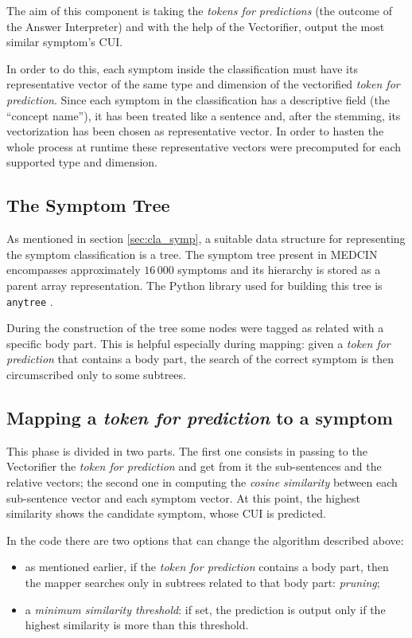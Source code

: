 The aim of this component is taking the \textit{tokens for predictions} (the outcome of the Answer Interpreter) and with the help of the Vectorifier, output the most similar symptom's CUI.

In order to do this, each symptom inside the classification must have its representative vector of the same type and dimension of the vectorified \textit{token for prediction}. Since each symptom in the classification has a descriptive field (the ``concept name''), it has been treated like a sentence and, after the stemming, its vectorization has been chosen as representative vector. In order to hasten the whole process at runtime these representative vectors were precomputed for each supported type and dimension.

\subsection{The Symptom Tree}
As mentioned in section \ref{sec:cla_symp}, a suitable data structure for representing the symptom classification is a tree. The symptom tree present in MEDCIN encompasses approximately $16\,000$ symptoms and its hierarchy is stored as a parent array representation. The Python library used for building this tree is \texttt{anytree} \cite{anytree}.

During the construction of the tree some nodes were tagged as related with a specific body part. This is helpful especially during mapping: given a \textit{token for prediction} that contains a body part, the search of the correct symptom is then circumscribed only to some subtrees.

\subsection{Mapping a \textit{token for prediction} to a symptom}
This phase is divided in two parts. The first one consists in passing to the Vectorifier the \textit{token for prediction} and get from it the sub-sentences and the relative vectors; the second one in computing the \textit{cosine similarity} between each sub-sentence vector and each symptom vector. At this point, the highest similarity shows the candidate symptom, whose CUI is predicted.

In the code there are two options that can change the algorithm described above:
\begin{itemize}
  \item as mentioned earlier, if the \textit{token for prediction} contains a body part, then the mapper searches only in subtrees related to that body part: \textit{pruning};
  \item a \textit{minimum similarity threshold}: if set, the prediction is output only if the highest similarity is more than this threshold. 
\end{itemize}
